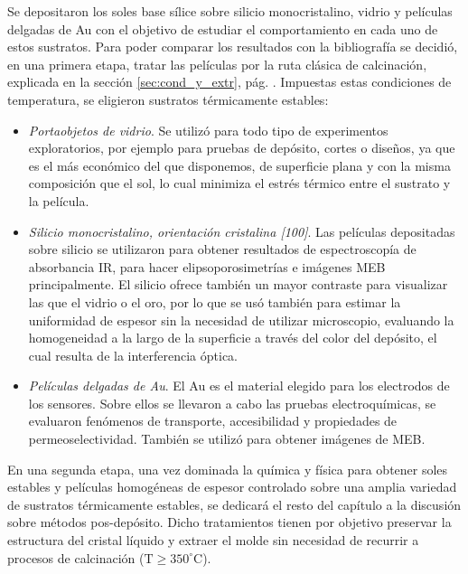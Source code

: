 	Se depositaron los soles base sílice sobre silicio monocristalino, vidrio y películas delgadas de Au con el objetivo de estudiar el comportamiento en cada uno de estos sustratos. Para poder comparar los resultados con la bibliografía\cite{Soler-Illia2006,Brinker1990} se decidió, en una primera etapa, tratar las películas por la ruta clásica de calcinación, explicada en la sección \ref{sec:cond_y_extr}, pág. \pageref{sec:cond_y_extr}. Impuestas estas condiciones de temperatura, se eligieron sustratos térmicamente estables:

		\begin{itemize}

			\item \textit{Portaobjetos de vidrio}. Se utilizó para todo tipo de experimentos exploratorios, por ejemplo para pruebas de depósito, cortes o diseños, ya que es el más económico del que disponemos, de superficie plana y con la misma composición que el sol, lo cual minimiza el estrés térmico entre el sustrato y la película.

			\item \textit{Silicio monocristalino, orientación cristalina [100]}. Las películas depositadas sobre silicio se utilizaron para obtener resultados de espectroscopía de absorbancia IR, para hacer elipsoporosimetrías e imágenes MEB principalmente. El silicio ofrece también un mayor contraste para visualizar las \pdm\space que el vidrio o el oro, por lo que se usó también para estimar la uniformidad de espesor sin la necesidad de utilizar microscopio, evaluando la homogeneidad a la largo de la superficie a través del color del depósito, el cual resulta de la interferencia óptica.
		
			\item \textit{Películas delgadas de Au}. El Au es el material elegido para los electrodos de los sensores. Sobre ellos se llevaron a cabo las pruebas electroquímicas, se evaluaron fenómenos de transporte, accesibilidad y propiedades de permeoselectividad. También se utilizó para obtener imágenes de MEB. 

			\end{itemize}
	
	En una segunda etapa, una vez dominada la química y física para obtener soles estables y películas homogéneas de espesor controlado sobre una amplia variedad de sustratos térmicamente estables, se dedicará el resto del capítulo a la discusión sobre métodos pos-depósito. Dicho tratamientos tienen por objetivo preservar la estructura del cristal líquido y extraer el molde sin necesidad de recurrir a procesos de calcinación ($\text{T} \geq 350^\circ \text{C}$).

